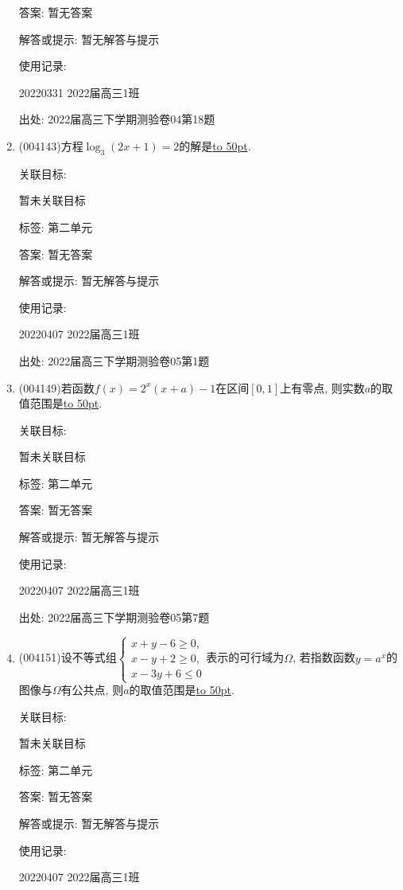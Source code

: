 \documentclass[10pt,a4paper]{article}
\newcommand{\blank}[1]{\underline{\hbox to #1pt{}}}
\begin{document}
\begin{enumerate}[1.]
答案: 暂无答案

解答或提示: 暂无解答与提示

使用记录:

20220331	2022届高三1班		


出处: 2022届高三下学期测验卷04第18题
\item { (004143)}方程$\log_3(2x+1)=2$的解是\blank{50}.


关联目标:

暂未关联目标



标签: 第二单元

答案: 暂无答案

解答或提示: 暂无解答与提示

使用记录:

20220407	2022届高三1班	


出处: 2022届高三下学期测验卷05第1题
\item { (004149)}若函数$f(x)=2^x(x+a)-1$在区间$[0,1]$上有零点, 则实数$a$的取值范围是\blank{50}.


关联目标:

暂未关联目标



标签: 第二单元

答案: 暂无答案

解答或提示: 暂无解答与提示

使用记录:

20220407	2022届高三1班	


出处: 2022届高三下学期测验卷05第7题
\item { (004151)}设不等式组$\begin{cases} x+y-6\ge 0, \\ x-y+2\ge 0, \\ x-3y+6\le 0 \end{cases}$表示的可行域为$\Omega$, 若指数函数$y=a^x$的图像与$\Omega$有公共点, 则$a$的取值范围是\blank{50}.


关联目标:

暂未关联目标



标签: 第二单元

答案: 暂无答案

解答或提示: 暂无解答与提示

使用记录:

20220407	2022届高三1班	



\end{enumerate}
\end{document}
